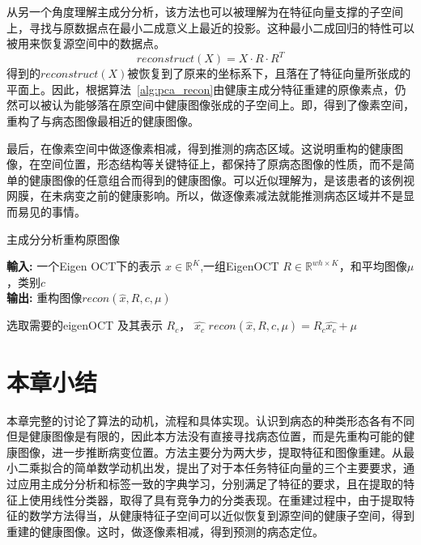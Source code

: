     从另一个角度理解主成分分析，该方法也可以被理解为在特征向量支撑的子空间上，寻找与原数据点在最小二成意义上最近的投影。这种最小二成回归的特性可以被用来恢复源空间中的数据点。
    \begin{equation}
        reconstruct(X) = X \cdot R \cdot R^T        
    \end{equation}
    得到的$reconstruct(X)$被恢复到了原来的坐标系下，且落在了特征向量所张成的平面上。因此，根据算法~\ref{alg:pca_recon}由健康主成分特征重建的原像素点，仍然可以被认为能够落在原空间中健康图像张成的子空间上。即，得到了像素空间，重构了与病态图像最相近的健康图像。

    最后，在像素空间中做逐像素相减，得到推测的病态区域。这说明重构的健康图像，在空间位置，形态结构等关键特征上，都保持了原病态图像的性质，而不是简单的健康图像的任意组合而得到的健康图像。可以近似理解为，是该患者的该例视网膜，在未病变之前的健康影响。所以，做逐像素减法就能推测病态区域并不是显而易见的事情。

    \begin{algorithm}[b]
        \caption{主成分分析重构原图像} %
        \hspace*{0.02in} {\bf 輸入:} %
        一个Eigen OCT下的表示 $\hat{x} \in \mathbb{R} ^{K} $,一组EigenOCT $R \in \mathbb{R} ^{wh \times K}$，和平均图像$\mu$，类别$c$\\
        \hspace*{0.02in} {\bf 输出:} %
        重构图像$recon(\hat{x}, R, c, \mu)$
        \begin{algorithmic}[1]
            \State 选取需要的eigenOCT 及其表示 $R_c$， $\hat{x_c}$
            \State $recon(\hat{x}, R, c, \mu) = R_c \hat{x_c} + \mu$
        \end{algorithmic}
        \label{alg:pca_recon}
    \end {algorithm}

    \section{本章小结}
    本章完整的讨论了算法的动机，流程和具体实现。认识到病态的种类形态各有不同但是健康图像是有限的，因此本方法没有直接寻找病态位置，而是先重构可能的健康图像，进一步推断病变位置。方法主要分为两大步，提取特征和图像重建。从最小二乘拟合的简单数学动机出发，提出了对于本任务特征向量的三个主要要求，通过应用主成分分析和标签一致的字典学习，分别满足了特征的要求，且在提取的特征上使用线性分类器，取得了具有竞争力的分类表现。在重建过程中，由于提取特征的数学方法得当，从健康特征子空间可以近似恢复到源空间的健康子空间，得到重建的健康图像。这时，做逐像素相减，得到预测的病态定位。

